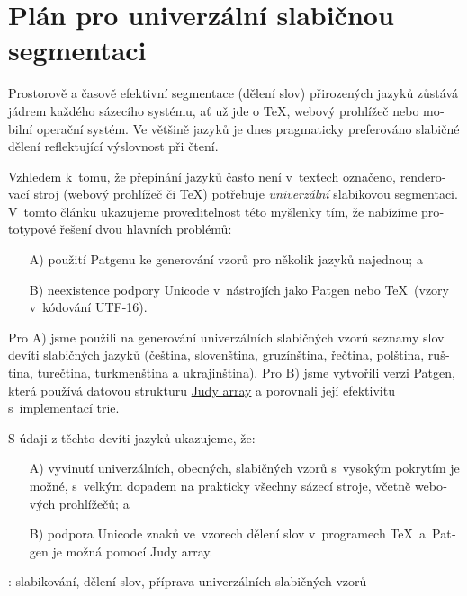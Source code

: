 \documentclass{csbulletin}
\let\program=\textrm %
\newcommand{\Patgen}{\program{Patgen}\xspace}
\begin{document}
\section*{Plán pro univerzální slabičnou segmentaci}
\begin{otherlanguage}{czech}
Prostorově a časově efektivní segmentace (dělení slov) přirozených jazyků zůstává jádrem každého sázecího systému, ať už jde o \TeX, webový prohlížeč nebo mobilní operační systém.
Ve většině jazyků je dnes pragmaticky preferováno slabičné dělení reflektující výslovnost při čtení.

Vzhledem k~tomu, že přepínání jazyků často není v~textech označeno, renderovací stroj (webový prohlížeč či \TeX) potřebuje \emph{univerzální} slabikovou segmentaci.
V~tomto článku ukazujeme proveditelnost této myšlenky tím, že nabízíme prototypové řešení dvou hlavních problémů:
\begin{enumerate}[leftmargin=.525cm]
     \item[A)] použití \Patgen{}u ke generování vzorů pro několik jazyků najednou; a
     \item[B)] neexistence podpory Unicode v~nástrojích jako \Patgen{} nebo \TeX\ (vzory v~kódování \mbox{UTF-16}).
\end{enumerate}

Pro A) jsme použili na generování univerzálních slabičných vzorů seznamy slov devíti slabičných jazyků
(čeština, slovenština, gruzínština, řečtina, polština, ruština, turečtina, turkmenština a ukrajinština).
Pro B) jsme vytvořili verzi \Patgen, která používá datovou strukturu
\href{https://en.wikipedia.org/wiki/Judy_array}{Judy array} a porovnali její efektivitu s~implementací trie.

S údaji z těchto devíti jazyků ukazujeme, že:
\begin{enumerate}[leftmargin=.525cm]
     \item[A)] vyvinutí univerzálních, obecných, slabičných vzorů s~vysokým pokrytím je
     možné, s~velkým dopadem na prakticky všechny sázecí stroje,
     včetně webových prohlížečů; a
   \item[B)] podpora Unicode znaků ve~vzorech dělení slov
     v~programech \TeX\ a~\Patgen je možná pomocí Judy array.
\end{enumerate}
\end{otherlanguage}
\klicovaslova: slabikování, dělení slov, příprava univerzálních slabičných vzorů
\end{document}
